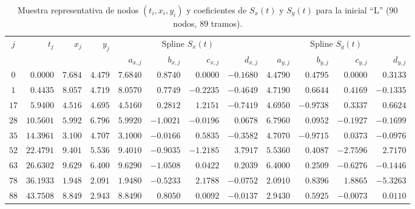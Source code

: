 \documentclass[11pt,letterpaper]{article}
\begin{document}
\begin{table}[H]
    \centering
    \caption{Muestra representativa de nodos $(t_i, x_i, y_i)$ y coeficientes de $S_x(t)$ y $S_y(t)$ para la inicial ``L'' ($90$ nodos, $89$ tramos).}
    \label{tab:p4_muestra}
    \scriptsize
    \begin{tabular}{c|rrr|rrrr|rrrr}
        \toprule
        \multirow{2}{*}{$j$} & \multirow{2}{*}{$t_j$} & \multirow{2}{*}{$x_j$} & \multirow{2}{*}{$y_j$} & \multicolumn{4}{c|}{Spline $S_x(t)$} & \multicolumn{4}{c}{Spline $S_y(t)$} \\
        \cmidrule(lr){5-8} \cmidrule(lr){9-12}
         & & & & $a_{x,j}$ & $b_{x,j}$ & $c_{x,j}$ & $d_{x,j}$ & $a_{y,j}$ & $b_{y,j}$ & $c_{y,j}$ & $d_{y,j}$ \\
        \midrule
        $0$  & $0.0000$  & $7.684$ & $4.479$ & $7.6840$ & $0.8740$  & $0.0000$  & $-0.1680$ & $4.4790$ & $0.4795$  & $0.0000$  & $0.3133$ \\
        $1$  & $0.4435$  & $8.057$ & $4.719$ & $8.0570$ & $0.7749$  & $-0.2235$ & $-0.4649$ & $4.7190$ & $0.6644$  & $0.4169$  & $-0.1335$ \\
        $17$ & $5.9400$  & $4.516$ & $4.695$ & $4.5160$ & $0.2812$  & $1.2151$  & $-0.7419$ & $4.6950$ & $-0.9738$ & $0.3337$  & $0.6624$ \\
        $28$ & $10.5601$ & $5.992$ & $6.796$ & $5.9920$ & $-1.0021$ & $-0.0196$ & $0.0678$  & $6.7960$ & $0.0952$  & $-0.1927$ & $-0.1699$ \\
        $35$ & $14.3961$ & $3.100$ & $4.707$ & $3.1000$ & $-0.0166$ & $0.5835$  & $-0.3582$ & $4.7070$ & $-0.9715$ & $0.0373$  & $-0.0976$ \\
        $52$ & $22.4791$ & $9.401$ & $5.536$ & $9.4010$ & $-0.9035$ & $-1.2185$ & $3.7917$  & $5.5360$ & $0.4087$  & $-2.7596$ & $2.7170$ \\
        $63$ & $26.6302$ & $9.629$ & $6.400$ & $9.6290$ & $-1.0508$ & $0.0422$  & $0.2039$  & $6.4000$ & $0.2509$  & $-0.6276$ & $-0.1446$ \\
        $78$ & $36.1933$ & $1.948$ & $2.091$ & $1.9480$ & $-0.5233$ & $2.1788$  & $-0.0752$ & $2.0910$ & $0.8396$  & $1.8865$  & $-5.3263$ \\
        $88$ & $43.7508$ & $8.849$ & $2.943$ & $8.8490$ & $0.8050$  & $0.0092$  & $-0.0137$ & $2.9430$ & $0.5925$  & $-0.0073$ & $0.0110$ \\
        \bottomrule
    \end{tabular}
\end{table}
\end{document}
